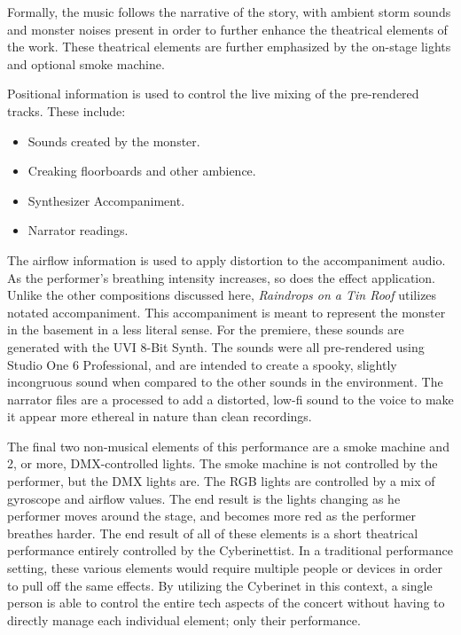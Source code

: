 Formally, the music follows the narrative of the story, with ambient storm sounds and monster noises present in order to further enhance the theatrical elements of the work. These theatrical elements are further emphasized by the on-stage lights and optional smoke machine.

Positional information is used to control the live mixing of the pre-rendered tracks. These include:
\begin{itemize}
    \item Sounds created by the monster.
    \item Creaking floorboards and other ambience.
    \item Synthesizer Accompaniment.
    \item Narrator readings.
\end{itemize}


The airflow information is used to apply distortion to the accompaniment audio. As the performer's breathing intensity increases, so does the effect application. Unlike the other compositions discussed here, \textit{Raindrops on a Tin Roof} utilizes notated accompaniment. This accompaniment is meant to represent the monster in the basement in a less literal sense. For the premiere, these sounds are generated with the UVI 8-Bit Synth. The sounds were all pre-rendered using Studio One 6 Professional, and are intended to create a spooky, slightly incongruous sound when compared to the other sounds in the environment. The narrator files are a processed to add a distorted, low-fi sound to the voice to make it appear more ethereal in nature than clean recordings. 

The final two non-musical elements of this performance are a smoke machine and 2, or more, DMX-controlled lights. The smoke machine is not controlled by the performer, but the DMX lights are. The RGB lights are controlled by a mix of gyroscope and airflow values. The end result is the lights changing as he performer moves around the stage, and becomes more red as the performer breathes harder. The end result of all of these elements is a short theatrical performance entirely controlled by the Cyberinettist. In a traditional performance setting, these various elements would require multiple people or devices in order to pull off the same effects. By utilizing the Cyberinet in this context, a single person is able to control the entire tech aspects of the concert without having to directly manage each individual element; only their performance.

